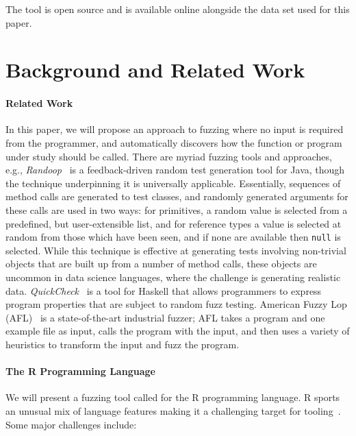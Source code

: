 \documentclass[sigplan,anonymous,review]{acmart}
\begin{document}
The tool is open source and is available online alongside the data set used for this paper.

\section{Background and Related Work}
\label{sec:background}

\paragraph{Related Work}

In this paper, we will propose an approach to fuzzing where no input is required from the programmer, and automatically discovers how the function or program under study should be called.
There are myriad fuzzing tools and approaches, e.g., \emph{Randoop}~\cite{pacheco2007randoop} is a feedback-driven random test generation tool for Java, though the technique underpinning it is universally applicable.
Essentially, sequences of method calls are generated to test classes, and randomly generated arguments for these calls are used in two ways: for primitives, a random value is selected from a predefined, but user-extensible list, and for reference types a value is selected at random from those which have been seen, and if none are available then {\tt null} is selected.
While this technique is effective at generating tests involving non-trivial objects that are built up from a number of method calls, these objects are uncommon in data science languages, where the challenge is generating realistic data.
\emph{QuickCheck}~\cite{quickcheck} is a tool for Haskell that allows programmers to express program properties that are subject to random fuzz testing.
American Fuzzy Lop (AFL)~\cite{afl} is a state-of-the-art industrial fuzzer; AFL takes a program and one example file as input, calls the program with the input, and then uses a variety of heuristics to transform the input and fuzz the program.

\paragraph{The R Programming Language}

We will present a fuzzing tool called \tool for the R programming language.
R sports an unusual mix of language features making it a challenging target for
tooling~\cite{morandat2012evaluating}. 
Some major challenges include:
\end{document}
